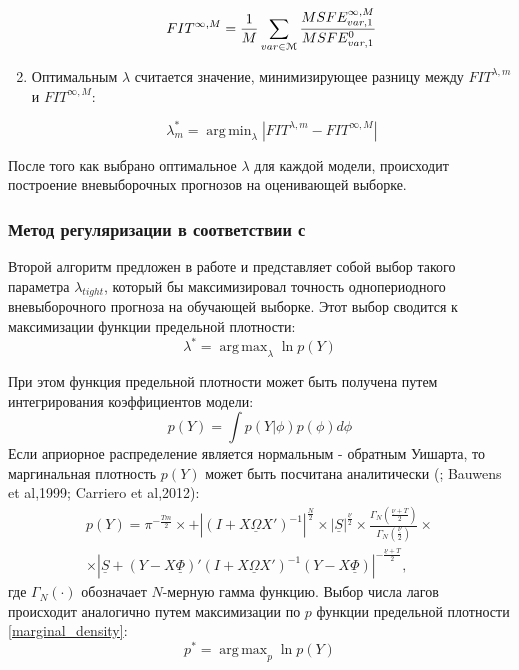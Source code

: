\documentclass[11pt]{article} %
\DeclareMathOperator*{\argmax}{arg\,max}
\DeclareMathOperator*{\argmin}{arg\,min}
\newcommand{\prior}{\underline}
\begin{document}
\begin{enumerate}
\begin{equation}
FIT^{\infty,M}=\frac{1}{M} \sum_{var\in \EuScript{M}} \frac{MSFE_{var,1}^{\infty,M}}{MSFE_{var,1}^{0}}
\end{equation}
\item Оптимальным $\lambda$ считается значение, минимизирующее разницу между $FIT^{\lambda,m}$ и $FIT^{\infty,M}$:

\begin{equation}
\lambda^*_m=\argmin_{\lambda} |FIT^{\lambda, m}-FIT^{\infty,M}|
\end{equation}
\end{enumerate}

После того как выбрано оптимальное $\lambda$ для каждой модели, происходит построение вневыборочных прогнозов на оценивающей выборке.

\subsubsection{Метод регуляризации в соответствии с  \cite{doan_al_1984}}

Второй алгоритм предложен в работе \cite{doan_al_1984} и представляет собой выбор такого параметра $\lambda_{tight}$, который бы максимизировал точность однопериодного вневыборочного прогноза на обучающей выборке. Этот выбор сводится к максимизации функции предельной плотности:
\begin{equation}
\lambda^*=\argmax_{\lambda} \ln p(Y)
\end{equation}

При этом функция предельной плотности может быть получена путем интегрирования коэффициентов модели:
\begin{equation}
p(Y)=\int p(Y|\phi)p(\phi) d \phi
\end{equation}
Если априорное распределение является нормальным - обратным Уишарта, то маргинальная плотность $p(Y)$ может быть посчитана аналитически (\cite{zellner_1996}; Bauwens et al,1999; Carriero et al,2012):
\begin{multline}
p(Y)=\pi^{-\frac{Tm}{2}}\times +\left |(I+X\prior{\Omega} X')^{-1}\right|^{\frac{N}{2}}\times |\prior{S}|^{\frac{\prior{\nu}}{2}}\times \frac{\Gamma_N(\frac{\prior{\nu}+T}{2})}{\Gamma_N(\frac{\prior{\nu}}{2})}\times \\ \times
\left|\prior{S}+(Y-X\prior{\Phi})'(I+X\prior{\Omega} X')^{-1}(Y-X\prior{\Phi})\right|^{-\frac{\prior{\nu}+T}{2}},\label{marginal_density}
\end{multline}
где $\Gamma_N(\cdot)$ обозначает $N$-мерную гамма функцию.
Выбор числа лагов происходит аналогично путем максимизации по $p$ функции предельной плотности \eqref{marginal_density}:
\begin{equation}
p^*=\argmax_{p} \ln p(Y)
\end{equation}
\end{document}
